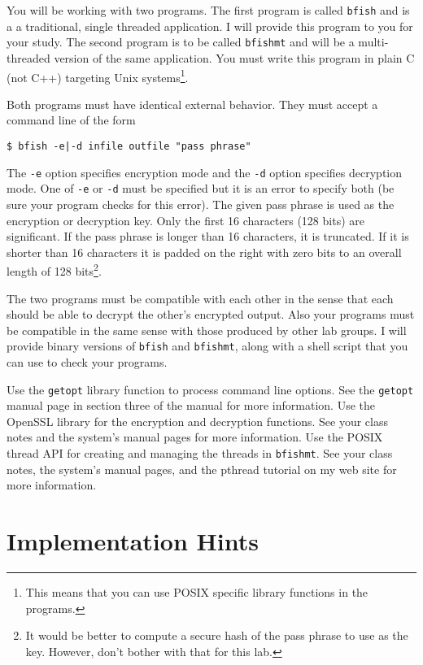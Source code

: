 \documentclass[twocolumn]{article}
\newcommand{\code}[1]{\texttt{#1}}
\newcommand{\filename}[1]{\texttt{#1}}
\begin{document}
You will be working with two programs. The first program is called \filename{bfish} and is a a
traditional, single threaded application. I will provide this program to you for your study. The
second program is to be called \filename{bfishmt} and will be a multi-threaded version of the
same application. You must write this program in plain C (not C++) targeting Unix
systems\footnote{This means that you can use POSIX specific library functions in the programs.}.

Both programs must have identical external behavior. They must accept a command line of the form

\begin{verbatim}
$ bfish -e|-d infile outfile "pass phrase"
\end{verbatim}

The \texttt{-e} option specifies encryption mode and the \texttt{-d} option specifies decryption
mode. One of \texttt{-e} or \texttt{-d} must be specified but it is an error to specify both (be
sure your program checks for this error). The given pass phrase is used as the encryption or
decryption key. Only the first 16 characters (128 bits) are significant. If the pass phrase is
longer than 16 characters, it is truncated. If it is shorter than 16 characters it is padded on
the right with zero bits to an overall length of 128 bits\footnote{It would be better to compute
a secure hash of the pass phrase to use as the key. However, don't bother with that for this
lab.}.

The two programs must be compatible with each other in the sense that each should be able to
decrypt the other's encrypted output. Also your programs must be compatible in the same sense
with those produced by other lab groups. I will provide binary versions of \filename{bfish} and
\filename{bfishmt}, along with a shell script that you can use to check your programs.

Use the \code{getopt} library function to process command line options. See the \code{getopt}
manual page in section three of the manual for more information. Use the OpenSSL library for the
encryption and decryption functions. See your class notes and the system's manual pages for more
information. Use the POSIX thread API for creating and managing the threads in
\filename{bfishmt}. See your class notes, the system's manual pages, and the pthread tutorial on
my web site for more information.

\section{Implementation Hints}
\end{document}

